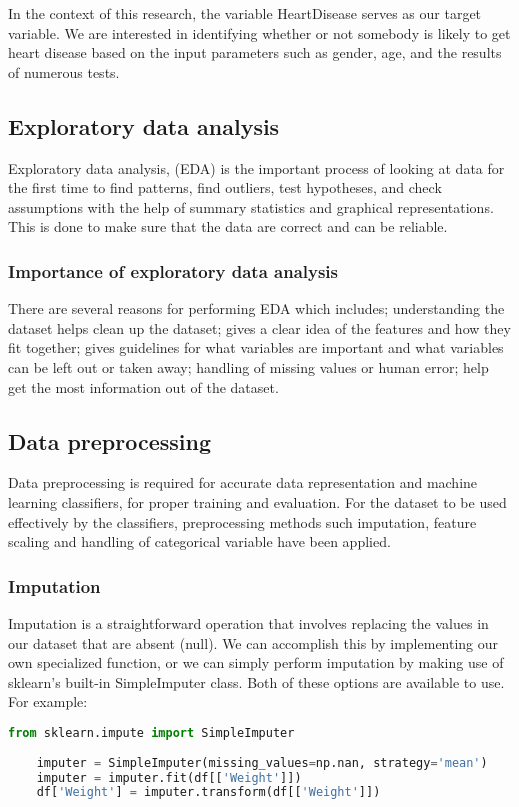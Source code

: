 In the context of this research, the variable HeartDisease serves as our target variable. We are interested in identifying whether or not somebody is likely to get heart disease based on the input parameters such as gender, age, and the results of numerous tests.

\subsection{Exploratory data analysis}
Exploratory data analysis, (EDA) is the important process of looking at data for the first time to find patterns, find outliers, test hypotheses, and check assumptions with the help of summary statistics and graphical representations. This is done to make sure that the data are correct and can be reliable. 

\subsubsection{Importance of exploratory data analysis}
There are several reasons for performing EDA which includes; understanding the dataset helps clean up the dataset; gives a clear idea of the features and how they fit together; gives guidelines for what variables are important and what variables can be left out or taken away; handling of missing values or human error; help get the most information out of the dataset.


\subsection{Data preprocessing}
Data preprocessing is required for accurate data representation and machine learning classifiers, for proper training and evaluation. For the dataset to be used effectively by the classifiers, preprocessing methods such imputation, feature scaling and handling of categorical variable have been applied.

\subsubsection{Imputation}
Imputation is a straightforward operation that involves replacing the values in our dataset that are absent (null). We can accomplish this by implementing our own specialized function, or we can simply perform imputation by making use of sklearn's built-in SimpleImputer class. Both of these options are available to use. For example:
\begin{lstlisting}[language=Python, numbers=none, label={lst:simple-imputer}]
	from sklearn.impute import SimpleImputer
	
	imputer = SimpleImputer(missing_values=np.nan, strategy='mean')
	imputer = imputer.fit(df[['Weight']])
	df['Weight'] = imputer.transform(df[['Weight']])
\end{lstlisting}

